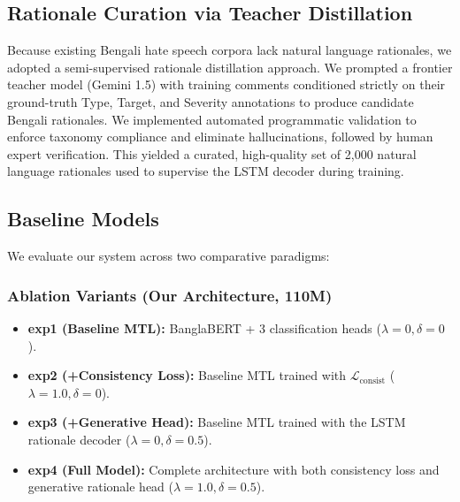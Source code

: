\documentclass[conference]{IEEEtran}
\begin{document}
\subsection{Rationale Curation via Teacher Distillation}
Because existing Bengali hate speech corpora lack natural language rationales, we adopted a semi-supervised rationale distillation approach. We prompted a frontier teacher model (Gemini 1.5) \cite{team2023gemini} with training comments conditioned strictly on their ground-truth Type, Target, and Severity annotations to produce candidate Bengali rationales. We implemented automated programmatic validation to enforce taxonomy compliance and eliminate hallucinations, followed by human expert verification. This yielded a curated, high-quality set of 2,000 natural language rationales used to supervise the LSTM decoder during training.

\subsection{Baseline Models}
We evaluate our system across two comparative paradigms:
\subsubsection{Ablation Variants (Our Architecture, 110M)}
\begin{itemize}
    \item \textbf{exp1 (Baseline MTL):} BanglaBERT + 3 classification heads ($\lambda = 0, \delta = 0$).
    \item \textbf{exp2 (+Consistency Loss):} Baseline MTL trained with $\mathcal{L}_{\text{consist}}$ ($\lambda = 1.0, \delta = 0$).
    \item \textbf{exp3 (+Generative Head):} Baseline MTL trained with the LSTM rationale decoder ($\lambda = 0, \delta = 0.5$).
    \item \textbf{exp4 (Full Model):} Complete architecture with both consistency loss and generative rationale head ($\lambda = 1.0, \delta = 0.5$).
\end{itemize}
\end{document}
